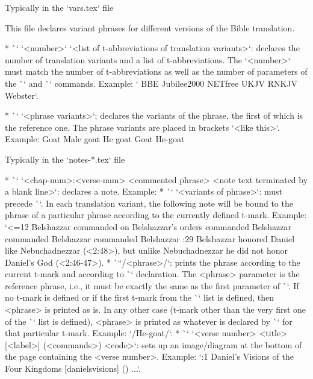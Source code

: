 {{\secc Typically in the `vars.tex` file

This file declares variant phrases for different versions of the Bible translation.

\begitems
* \`\variants` `<number>` `<list of t-abbreviations of translation variants>`: declares the number of
  translation variants and a list of \hbox{t-abbreviations}. The `<number>` must match the number of
  t-abbreviations as well as the number of parameters of the \`\vdef` and \`\ww` commands.
Example:
` {BBE} {Jubilee2000} {NETfree} {UKJV} {RNKJV} {Webster}`. 
  
* \`\vdef` `<phrase variants>`; declares the variants of the phrase, the first of which is
 the reference one. The phrase variants are placed in brackets `{<like this>}`.
 Example: 
 \begtt
       {Goat}      %
       {Male goat} %
       {He goat}   %
       {Goat}      %
       {He-goat}   %
\endtt      
\enditems

\secc Typically in the `notes-*.tex` file

\begitems
* \`\Note` `<chap-num>:<verse-num> {<commented phrase>} <note text terminated by a blank line>`:
  declares a note. Example:   
* \`\ww` `<variants of phrase>`: must precede \`\Note`. In
  each translation variant, the following note will be bound to the phrase
  of a particular phrase according to the currently defined t-mark.
 Example:
\begtt \catcode`<=12
    {Belshazzar commanded}       %
    {on Belshazzar's orders}     %
    {commanded Belshazzar}       %
    {commanded Belshazzar}       %
    {commanded Belshazzar}       %
 :29 {}  Belshazzar honored Daniel like Nebuchadnezzar (<2:48>),  
       but unlike Nebuchadnezzar he did not honor Daniel's God (<2:46-47>).    
\endtt
* \`\x``/<phrase>/`: prints the phrase according to the current t-mark and according to   \`\vdef` 
declaration. 
  The <phrase> parameter is the reference phrase, i.e., it must be exactly the same as the first 
  parameter of \`\vdef`.
    If no t-mark is defined or if the first t-mark from the \`\variants` list is defined, then 
  <phrase> is printed as is. In any other case (t-mark other than the very first one of the 
  \`\variants` list is defined),  <phrase> is printed as whatever is declared by \`\vdef` for that 
  particular t-mark.
  Example: `\x/He-goat/`.
* \`\putBot` `<verse number> {<title>} [<label>] (<commands>) {<code>}`:
  sets up an image/diagram at the bottom of the page containing the <verse number>.   
  Example:\nl
`:1 {Daniel's Visions of the Four Kingdoms} [danielsvisions] () {...}`.

}}
